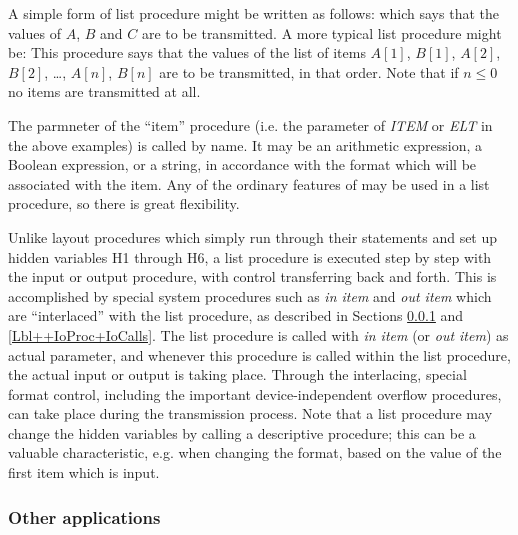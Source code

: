 \documentclass[a4paper,11pt]{article}
\begin{document}
A simple form of list procedure might be written as follows:
\noindent{}which says that the values of $A$, $B$ and $C$ are to be
transmitted.  A more typical list procedure might be:
\noindent{}This procedure says that the values of the list of items
$A[1]$, $B[1]$, $A[2]$, $B[2]$, \dots, $A[n]$, $B[n]$ are to be
transmitted, in that order. Note that if $n \leq 0$ no items are
transmitted at all.

The parmneter of the ``item'' procedure (i.e. the parameter of {\it
ITEM} or {\it ELT} in the above examples) is called by name.  It may
be an arithmetic expression, a Boolean expression, or a string, in
accordance with the format which will be associated with the item.
Any of the ordinary features of \Algol may be used in a list
procedure, so there is great flexibility.

Unlike layout procedures which simply run through their statements and
set up hidden variables H1 through H6, a list procedure is executed
step by step with the input or output procedure, with control
transferring back and forth.  This is accomplished by special system
procedures such as {\it in item} and {\it out item} which are
``interlaced'' with the list procedure, as described in Sections
\ref{Lbl++IoProc+ListProc+Other} and \ref{Lbl++IoProc+IoCalls}.  The
list procedure is called with {\it in item} (or {\it out item}) as
actual parameter, and whenever this procedure is called within the
list procedure, the actual input or output is taking place.  Through
the interlacing, special format control, including the important
device-independent overflow procedures, can take place during the
transmission process.  Note that a list procedure may change the
hidden variables by calling a descriptive procedure; this can be a
valuable characteristic, e.g. when changing the format, based on the
value of the first item which is input.

\subsubsection{Other applications}
\label{Lbl++IoProc+ListProc+Other}
\end{document}
